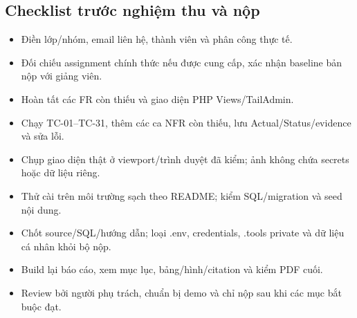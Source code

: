 \subsection{Checklist trước nghiệm thu và nộp}
\begin{itemize}[label=$\square$,itemsep=1pt,parsep=0pt]
\item Điền lớp/nhóm, email liên hệ, thành viên và phân công thực tế.
\item Đối chiếu assignment chính thức nếu được cung cấp, xác nhận baseline bản nộp với giảng viên.
\item Hoàn tất các FR còn thiếu và giao diện PHP Views/TailAdmin.
\item Chạy TC-01–TC-31, thêm các ca NFR còn thiếu, lưu Actual/Status/evidence và sửa lỗi.
\item Chụp giao diện thật ở viewport/trình duyệt đã kiểm; ảnh không chứa secrets hoặc dữ liệu riêng.
\item Thử cài trên môi trường sạch theo README; kiểm SQL/migration và seed nội dung.
\item Chốt source/SQL/hướng dẫn; loại .env, credentials, .tools private và dữ liệu cá nhân khỏi bộ nộp.
\item Build lại báo cáo, xem mục lục, bảng/hình/citation và kiểm PDF cuối.
\item Review bởi người phụ trách, chuẩn bị demo và chỉ nộp sau khi các mục bắt buộc đạt.
\end{itemize}
\endgroup
